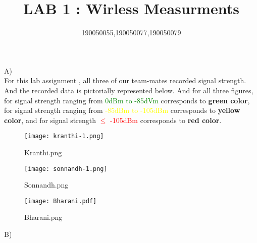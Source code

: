 \documentclass[11pt,a4paper]{article}
\title{\textbf{LAB 1 : Wirless Measurments}}
\author{190050055,190050077,190050079}
\begin{document}
\maketitle 


\newpage
{\huge A)}\\

\vspace{0.5cm}
For this lab assignment , all three of our team-mates recorded signal strength. And the recorded data is pictorially represented below. And for all three figures, for signal strength ranging from \textcolor{green}{0dBm to -85dVm}  corresponds to \textbf{green color}, for signal strength ranging from \textcolor{yellow}{-85dBm to -105dBm} corresponds to \textbf{yellow color}, and for signal strength  \textcolor{red}{$\leq$ -105dBm} corresponds to \textbf{red color}.  

\begin{SCfigure}[0.5][h]
\caption{Kranthi.png}
\texttt{[image: kranthi-1.png]}
\end{SCfigure}
\begin{SCfigure}[0.5][h]
\caption{Sonnandh.png}
\texttt{[image: sonnandh-1.png]}
\end{SCfigure}
\begin{SCfigure}[0.5][h]
\caption{Bharani.png}
\texttt{[image: Bharani.pdf]}
\end{SCfigure}
\vspace{8pt}
\newpage
{\huge B)}\\
\end{document}
